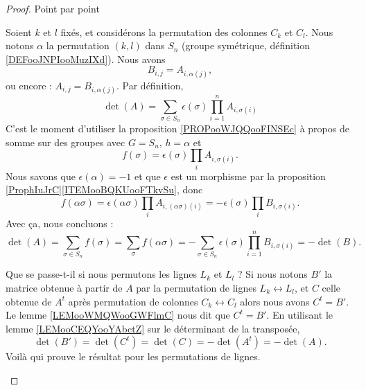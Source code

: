 \begin{proof}
	Point par point
	\begin{subproof}

		Soient \( k\) et \( l\) fixés, et considérons la permutation des colonnes \( C_k\) et \( C_l\). Nous notons \( \alpha\) la permutation \( (k,l)\) dans \( S_n\) (groupe symétrique, définition \ref{DEFooJNPIooMuzIXd}). Nous avons
		\begin{equation}
			B_{i,j}=A_{i,\alpha(j)},
		\end{equation}
		ou encore : \( A_{i,j}=B_{i,\alpha(j)}\). Par définition,
		\begin{equation}
			\det(A)=\sum_{\sigma\in S_{n}}\epsilon(\sigma)\prod_{i=1}^n A_{i,\sigma(i)}
		\end{equation}
		C'est le moment d'utiliser la proposition \ref{PROPooWJQQooFINSEc} à propos de somme sur des groupes avec \( G=S_n\), \( h=\alpha\) et
		\begin{equation}
			f(\sigma)=\epsilon(\sigma)\prod_iA_{i,\sigma(i)}.
		\end{equation}
		Nous savons que \( \epsilon(\alpha)=-1\) et que \( \epsilon\) est un morphisme par la proposition \ref{ProphIuJrC}\ref{ITEMooBQKUooFTkvSu}, donc
		\begin{equation}
			f(\alpha \sigma)=\epsilon(\alpha\sigma)\prod_iA_{i,(\alpha\sigma)(i)}=-\epsilon(\sigma)\prod_iB_{i,\sigma(i)}.
		\end{equation}
		Avec ça, nous concluons :
		\begin{equation}
			\det(A)=\sum_{\sigma\in S_n}f(\sigma)=\sum_{\sigma}f(\alpha \sigma)=-\sum_{\sigma\in S_n}\epsilon(\sigma)\prod_{i=1}^n B_{i,\sigma(i)}=-\det(B).
		\end{equation}

		Que se passe-t-il si nous permutons les lignes \( L_k\) et \( L_{l}\) ? Si nous notons \( B'\) la matrice obtenue à partir de \( A\) par la permutation de lignes \( L_k\leftrightarrow L_l\), et \( C\) celle obtenue de \( A^t\) après permutation de colonnes \( C_k\leftrightarrow C_l\) alors nous avons \( C^t=B'\). Le lemme \ref{LEMooWMQWooGWFlmC} nous dit que \( C^t=B'\). En utilisant le lemme \ref{LEMooCEQYooYAbctZ} sur le déterminant de la transposée,
		\begin{equation}
			\det(B')=\det(C^t)=\det(C)=-\det(A^t)=-\det(A).
		\end{equation}
		Voilà qui prouve le résultat pour les permutations de lignes.


\end{subproof}
\end{proof}
